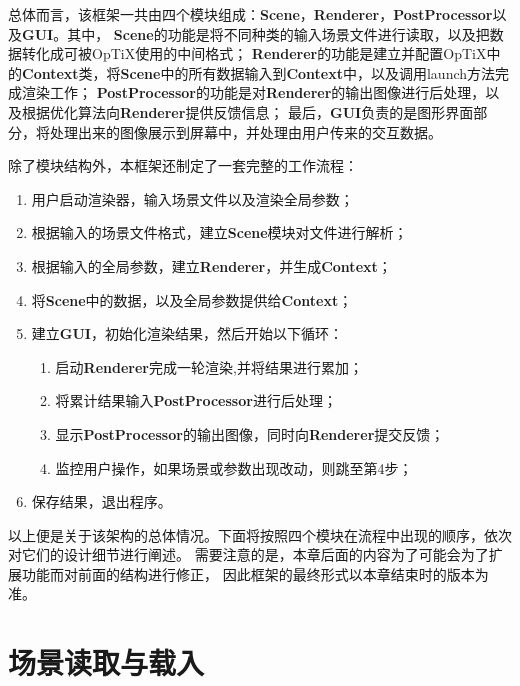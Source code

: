 总体而言，该框架一共由四个模块组成：\textbf{\textbf{Scene}}，\textbf{Renderer}，\textbf{PostProcessor}以及\textbf{GUI}。其中，
\textbf{\textbf{Scene}}的功能是将不同种类的输入场景文件进行读取，以及把数据转化成可被OpTiX使用的中间格式；
\textbf{Renderer}的功能是建立并配置OpTiX中的\textbf{Context}类，将\textbf{\textbf{Scene}}中的所有数据输入到\textbf{Context}中，以及调用launch方法完成渲染工作；
\textbf{PostProcessor}的功能是对\textbf{Renderer}的输出图像进行后处理，以及根据优化算法向\textbf{Renderer}提供反馈信息；
最后，\textbf{GUI}负责的是图形界面部分，将处理出来的图像展示到屏幕中，并处理由用户传来的交互数据。

除了模块结构外，本框架还制定了一套完整的工作流程：

\begin{enumerate}
    \item{用户启动渲染器，输入场景文件以及渲染全局参数；}
    \item{根据输入的场景文件格式，建立\textbf{\textbf{Scene}}模块对文件进行解析；}
    \item{根据输入的全局参数，建立\textbf{Renderer}，并生成\textbf{Context}；}
    \item{将\textbf{\textbf{Scene}}中的数据，以及全局参数提供给\textbf{Context}；}
    \item{建立\textbf{GUI}，初始化渲染结果，然后开始以下循环：}
    \begin{enumerate}
        \item{启动\textbf{Renderer}完成一轮渲染,并将结果进行累加；}
        \item{将累计结果输入\textbf{PostProcessor}进行后处理；}
        \item{显示\textbf{PostProcessor}的输出图像，同时向\textbf{Renderer}提交反馈；}
        \item{监控用户操作，如果场景或参数出现改动，则跳至第4步；}
    \end{enumerate}
    \item{保存结果，退出程序。}
\end{enumerate}

以上便是关于该架构的总体情况。下面将按照四个模块在流程中出现的顺序，依次对它们的设计细节进行阐述。
需要注意的是，本章后面的内容为了可能会为了扩展功能而对前面的结构进行修正，
因此框架的最终形式以本章结束时的版本为准。

\section{场景读取与载入}

